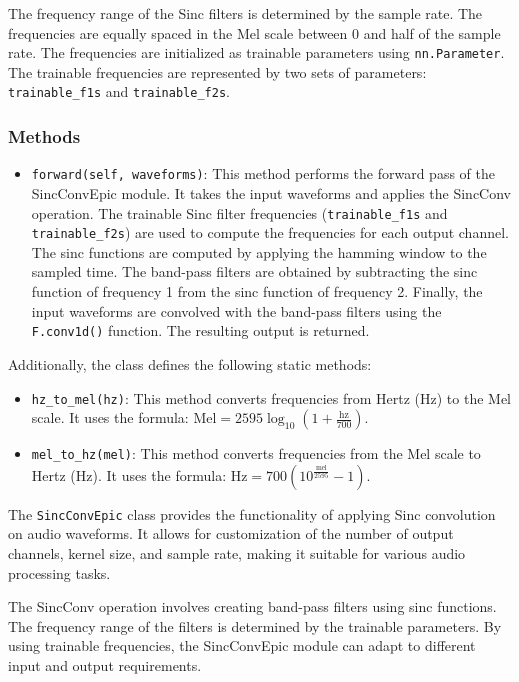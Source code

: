 \documentclass[a4paper]{article}
\begin{document}
The frequency range of the Sinc filters is determined by the sample rate. The frequencies are equally spaced in the Mel scale between 0 and half of the sample rate. The frequencies are initialized as trainable parameters using \texttt{nn.Parameter}. The trainable frequencies are represented by two sets of parameters: \texttt{trainable\_f1s} and \texttt{trainable\_f2s}.

\subsubsection{Methods}

\begin{itemize}
    \item \texttt{forward(self, waveforms)}: This method performs the forward pass of the SincConvEpic module. It takes the input waveforms and applies the SincConv operation. The trainable Sinc filter frequencies (\texttt{trainable\_f1s} and \texttt{trainable\_f2s}) are used to compute the frequencies for each output channel. The sinc functions are computed by applying the hamming window to the sampled time. The band-pass filters are obtained by subtracting the sinc function of frequency 1 from the sinc function of frequency 2. Finally, the input waveforms are convolved with the band-pass filters using the \texttt{F.conv1d()} function. The resulting output is returned.
\end{itemize}

Additionally, the class defines the following static methods:

\begin{itemize}
    \item \texttt{hz\_to\_mel(hz)}: This method converts frequencies from Hertz (Hz) to the Mel scale. It uses the formula: \(\text{{Mel}} = 2595 \log_{10}(1 + \frac{{\text{{hz}}}}{{700}})\).
    \item \texttt{mel\_to\_hz(mel)}: This method converts frequencies from the Mel scale to Hertz (Hz). It uses the formula: \(\text{{Hz}} = 700 \left(10^{\frac{{\text{{mel}}}}{{2595}}} - 1\right)\).
\end{itemize}

The \texttt{SincConvEpic} class provides the functionality of applying Sinc convolution on audio waveforms. It allows for customization of the number of output channels, kernel size, and sample rate, making it suitable for various audio processing tasks.

The SincConv operation involves creating band-pass filters using sinc functions. The frequency range of the filters is determined by the trainable parameters. By using trainable frequencies, the SincConvEpic module can adapt to different input and output requirements.
\end{document}
